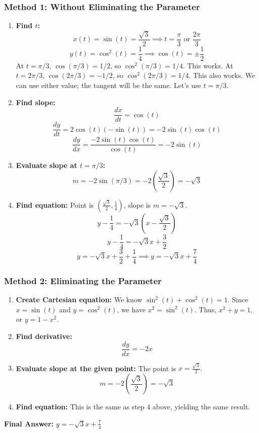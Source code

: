 \documentclass{article}
\begin{document}
\subsubsection*{Method 1: Without Eliminating the Parameter}
\begin{enumerate}
    \item \textbf{Find $t$:}
    \[ x(t) = \sin(t) = \frac{\sqrt{3}}{2} \implies t = \frac{\pi}{3} \text{ or } \frac{2\pi}{3} \]
    \[ y(t) = \cos^2(t) = \frac{1}{4} \implies \cos(t) = \pm\frac{1}{2} \]
    At $t=\pi/3$, $\cos(\pi/3) = 1/2$, so $\cos^2(\pi/3) = 1/4$. This works.
    At $t=2\pi/3$, $\cos(2\pi/3) = -1/2$, so $\cos^2(2\pi/3) = 1/4$. This also works. We can use either value; the tangent will be the same. Let's use $t=\pi/3$.
    \item \textbf{Find slope:}
    \[ \frac{dx}{dt} = \cos(t) \]
    \[ \frac{dy}{dt} = 2\cos(t)(-\sin(t)) = -2\sin(t)\cos(t) \]
    \[ \frac{dy}{dx} = \frac{-2\sin(t)\cos(t)}{\cos(t)} = -2\sin(t) \]
    \item \textbf{Evaluate slope at $t=\pi/3$:}
    \[ m = -2\sin(\pi/3) = -2\left(\frac{\sqrt{3}}{2}\right) = -\sqrt{3} \]
    \item \textbf{Find equation:} Point is $(\frac{\sqrt{3}}{2}, \frac{1}{4})$, slope is $m=-\sqrt{3}$.
    \[ y - \frac{1}{4} = -\sqrt{3}\left(x - \frac{\sqrt{3}}{2}\right) \]
    \[ y - \frac{1}{4} = -\sqrt{3}x + \frac{3}{2} \]
    \[ y = -\sqrt{3}x + \frac{3}{2} + \frac{1}{4} \implies y = -\sqrt{3}x + \frac{7}{4} \]
\end{enumerate}
\subsubsection*{Method 2: Eliminating the Parameter}
\begin{enumerate}
    \item \textbf{Create Cartesian equation:} We know $\sin^2(t) + \cos^2(t) = 1$. Since $x = \sin(t)$ and $y = \cos^2(t)$, we have $x^2 = \sin^2(t)$. Thus, $x^2 + y = 1$, or $y = 1 - x^2$.
    \item \textbf{Find derivative:}
    \[ \frac{dy}{dx} = -2x \]
    \item \textbf{Evaluate slope at the given point:} The point is $x = \frac{\sqrt{3}}{2}$.
    \[ m = -2\left(\frac{\sqrt{3}}{2}\right) = -\sqrt{3} \]
    \item \textbf{Find equation:} This is the same as step 4 above, yielding the same result.
\end{enumerate}
\textbf{Final Answer:} $y = -\sqrt{3}x + \frac{7}{4}$
\end{document}
